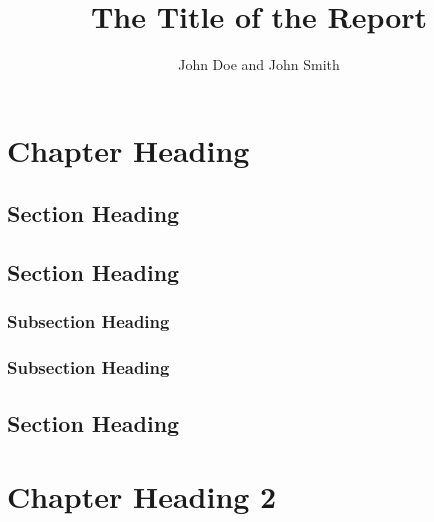 \documentclass{aaltoseries}
\author{John Doe and John Smith}
\title{The Title of the Report}
\begin{document}
\draftabstract{\lipsum[1-3]}




















\begin{preface}%
\lipsum[1-4]
\end{preface}

\tableofcontents

\chapter{Chapter Heading}
\section{Section Heading}
\lipsum[1-4]
\section{Section Heading}
\lipsum[5-6]
\subsection{Subsection Heading}
\lipsum[7-8]
\subsection{Subsection Heading}
\lipsum[9-10]
\section{Section Heading}
\lipsum[11-12]


\chapter{Chapter Heading 2}
\end{document}

